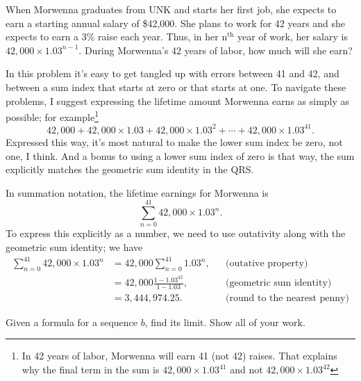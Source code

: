 \documentclass[12pt,fleqn,answers]{exam}
\begin{document}
\begin{questions} 
    
   \question[2] When Morwenna graduates from UNK and starts her first job, she expects to earn a 
   starting annual salary of \$42,000. She plans to work for 42 years
   and she expects to earn a 3\% raise each year. Thus, in her 
   $\mathrm{n}^{\mathrm{th}}$  year 
   of work, her salary is $42,000 \times 1.03^{n-1}$. During 
   Morwenna's 42 years of labor, how much will she earn?

   \begin{solution}[2.5in] In this problem it's easy to get tangled up 
      with errors between 41 and 42, and between a sum index that starts 
      at zero or that starts at one. To navigate these problems, I suggest 
      expressing the lifetime amount Morwenna earns as simply as possible;
      for example\footnote{In 42 years of labor, Morwenna will earn 41 (not 42) raises. That 
      explains why the final term in the sum is $42,000 \times 1.03^{41}$
      and not $42,000 \times 1.03^{42}$}
      \begin{equation*}
         42,000 + 42,000 \times 1.03 + 42,000 \times 1.03^2 + \cdots 
         + 42,000 \times 1.03^{41}.
      \end{equation*}
   Expressed this way, it's most natural to make the lower sum index be 
   zero, not one, I think. And a bonus to using a lower sum index of zero 
   is that way, the sum explicitly matches the geometric sum identity in the 
   QRS. 
   

   In summation notation, the lifetime earnings for Morwenna is 
   \begin{equation*}
     \sum_{n=0}^{41} 42,000 \times 1.03^n.
   \end{equation*}
   To express this explicitly as a number, we need to use outativity
   along with the geometric sum identity; we have
   \begin{align*}
      \sum_{n=0}^{41} 42,000 \times 1.03^n &= 42,000 \sum_{n=0}^{41}  1.03^n, && \text{(outative property)} \\
                  &= 42,000 \frac{1 - 1.03^{42}}{1-1.03},  &&\text{(geometric sum identity)} \\
                  &= 3,444,974.25.  && \text{(round to the nearest penny)}
   \end{align*}
      \end{solution}

   \question Given a formula for a sequence $b$, find its limit.
   Show all of your work.


\end{questions}
\end{document}
